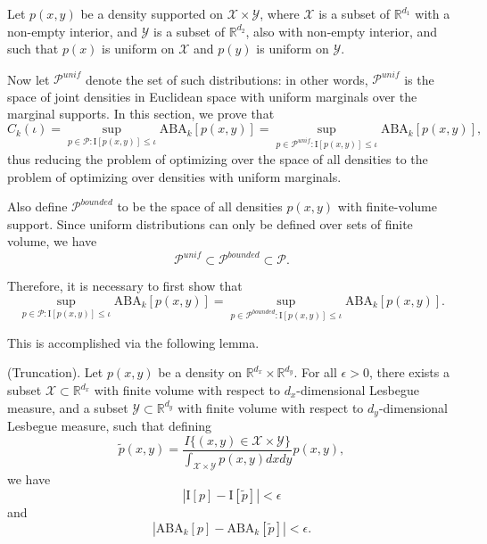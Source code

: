Let $p(x, y)$ be a density supported on
$\mathcal{X} \times \mathcal{Y}$, where $\mathcal{X}$ is a subset of
$\mathbb{R}^{d_1}$ with a non-empty interior, and $\mathcal{Y}$ is a subset of
$\mathbb{R}^{d_2}$, also with non-empty interior, and such that $p(x)$ is uniform on $\mathcal{X}$
and $p(y)$ is uniform on $\mathcal{Y}$.

Now let $\mathcal{P}^{unif}$ denote the set of such distributions:
in other words, $\mathcal{P}^{unif}$ is the space of joint densities in Euclidean space
with uniform marginals over the marginal supports.
In this section, we prove that
\[
C_k(\iota) =\sup_{p \in \mathcal{P}: \text{I}[p(x,y)] \leq \iota} \text{ABA}_k[p(x,y)] = 
\sup_{p \in \mathcal{P}^{unif}: \text{I}[p(x,y)] \leq \iota} \text{ABA}_k[p(x,y)],
\]
thus reducing the problem of optimizing over the space of all
densities to the problem of optimizing over densities with uniform
marginals.

Also define $\mathcal{P}^{bounded}$ to be the space of all densities $p(x, y)$ with finite-volume support.
Since uniform distributions can only be defined over sets of finite volume, we have
\[
\mathcal{P}^{unif} \subset \mathcal{P}^{bounded} \subset \mathcal{P}.
\]

Therefore, it is necessary to first show that
\[
\sup_{p \in \mathcal{P}: \text{I}[p(x,y)] \leq \iota} \text{ABA}_k[p(x,y)] = 
\sup_{p \in \mathcal{P}^{bounded}: \text{I}[p(x,y)] \leq \iota} \text{ABA}_k[p(x,y)].
\]

This is accomplished via the following lemma.

\begin{lemma}\label{lemma:truncation} (Truncation).
Let $p(x, y)$ be a density on
$\mathbb{R}^{d_x} \times \mathbb{R}^{d_y}$.  For all $\epsilon > 0$,
there exists a subset $\mathcal{X} \subset \mathbb{R}^{d_x}$ with
finite volume with respect to $d_x$-dimensional Lesbegue measure, and
a subset $\mathcal{Y} \subset \mathbb{R}^{d_y}$ with finite volume
with respect to $d_y$-dimensional Lesbegue measure, such that defining
\[
\tilde{p}(x, y) = \frac{I\{(x,y) \in \mathcal{X}\times \mathcal{Y}\} }{\int_{\mathcal{X} \times \mathcal{Y}} p(x,y) dx dy} p(x,y),
\]
we have
\[
|\text{I}[p] - \text{I}[\tilde{p}]| < \epsilon
\]
and
\[
|\text{ABA}_k[p] - \text{ABA}_k[\tilde{p}]| < \epsilon.
\]
\end{lemma}

